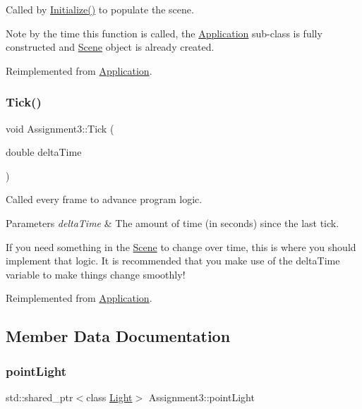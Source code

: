Called by \hyperlink{class_application_a17cf1ea4552d26a1c20f7d98d793d41d}{Initialize()} to populate the scene. 

Note by the time this function is called, the \hyperlink{class_application}{Application} sub-\/class is fully constructed and \hyperlink{class_scene}{Scene} object is already created. 

Reimplemented from \hyperlink{class_application_aa8e8017ef8dd86293c96d0645e66d440}{Application}.

\hypertarget{class_assignment3_a11256b6e7b38ab24baa92729cfb8ffe2}{}\label{class_assignment3_a11256b6e7b38ab24baa92729cfb8ffe2} 
\subsubsection{\texorpdfstring{Tick()}{Tick()}}
{\footnotesize\ttfamily void Assignment3\+::\+Tick (\begin{DoxyParamCaption}\item[{double}]{delta\+Time }\end{DoxyParamCaption})\hspace{0.3cm}{\ttfamily [virtual]}}



Called every frame to advance program logic. 


\begin{DoxyParams}{Parameters}
{\em delta\+Time} & The amount of time (in seconds) since the last tick.\\
\hline
\end{DoxyParams}
If you need something in the \hyperlink{class_scene}{Scene} to change over time, this is where you should implement that logic. It is recommended that you make use of the delta\+Time variable to make things change smoothly! 

Reimplemented from \hyperlink{class_application_a0800afd5651153d31fa775a8048d14dd}{Application}.



\subsection{Member Data Documentation}
\hypertarget{class_assignment3_ad1cf5a76d62b5a1ed17e66c31e0feb98}{}\label{class_assignment3_ad1cf5a76d62b5a1ed17e66c31e0feb98} 
\subsubsection{\texorpdfstring{point\+Light}{pointLight}}
{\footnotesize\ttfamily std\+::shared\+\_\+ptr$<$class \hyperlink{class_light}{Light}$>$ Assignment3\+::point\+Light\hspace{0.3cm}{\ttfamily [private]}}

